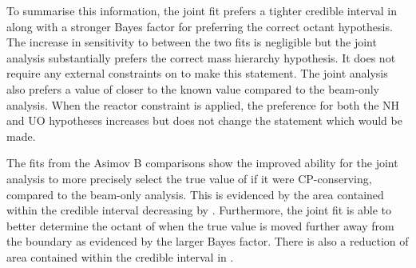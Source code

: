 To summarise this information, the joint fit prefers a tighter \quickmath{1\sigma} credible interval in  along with a stronger Bayes factor for preferring the correct octant hypothesis. The increase in sensitivity to  between the two fits is negligible but the joint analysis substantially prefers the correct mass hierarchy hypothesis. It does not require any external constraints on  to make this statement. The joint analysis also prefers a value of  closer to the known value compared to the beam-only analysis. When the reactor constraint is applied, the preference for both the NH and UO hypotheses increases but does not change the statement which would be made.

The fits from the Asimov B comparisons show the improved ability for the joint analysis to more precisely select the true value of  if it were CP-conserving, compared to the beam-only analysis. This is evidenced by the area contained within the \quickmath{1\sigma} credible interval decreasing by . Furthermore, the joint fit is able to better determine the octant of  when the true value is moved further away from the boundary as evidenced by the larger Bayes factor. There is also a  reduction of area contained within the \quickmath{1\sigma} credible interval in .
